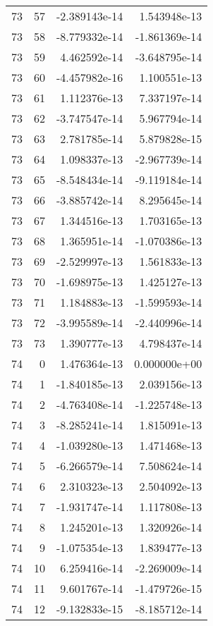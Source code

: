 \begin{tabular}{rrrr}
  73 &   57 & -2.389143e-14 &  1.543948e-13 \\
  73 &   58 & -8.779332e-14 & -1.861369e-14 \\
  73 &   59 &  4.462592e-14 & -3.648795e-14 \\
  73 &   60 & -4.457982e-16 &  1.100551e-13 \\
  73 &   61 &  1.112376e-13 &  7.337197e-14 \\
  73 &   62 & -3.747547e-14 &  5.967794e-14 \\
  73 &   63 &  2.781785e-14 &  5.879828e-15 \\
  73 &   64 &  1.098337e-13 & -2.967739e-14 \\
  73 &   65 & -8.548434e-14 & -9.119184e-14 \\
  73 &   66 & -3.885742e-14 &  8.295645e-14 \\
  73 &   67 &  1.344516e-13 &  1.703165e-13 \\
  73 &   68 &  1.365951e-14 & -1.070386e-13 \\
  73 &   69 & -2.529997e-13 &  1.561833e-13 \\
  73 &   70 & -1.698975e-13 &  1.425127e-13 \\
  73 &   71 &  1.184883e-13 & -1.599593e-14 \\
  73 &   72 & -3.995589e-14 & -2.440996e-14 \\
  73 &   73 &  1.390777e-13 &  4.798437e-14 \\
  74 &    0 &  1.476364e-13 &  0.000000e+00 \\
  74 &    1 & -1.840185e-13 &  2.039156e-13 \\
  74 &    2 & -4.763408e-14 & -1.225748e-13 \\
  74 &    3 & -8.285241e-14 &  1.815091e-13 \\
  74 &    4 & -1.039280e-13 &  1.471468e-13 \\
  74 &    5 & -6.266579e-14 &  7.508624e-14 \\
  74 &    6 &  2.310323e-13 &  2.504092e-13 \\
  74 &    7 & -1.931747e-14 &  1.117808e-13 \\
  74 &    8 &  1.245201e-13 &  1.320926e-14 \\
  74 &    9 & -1.075354e-13 &  1.839477e-13 \\
  74 &   10 &  6.259416e-14 & -2.269009e-14 \\
  74 &   11 &  9.601767e-14 & -1.479726e-15 \\
  74 &   12 & -9.132833e-15 & -8.185712e-14 \\

\end{tabular}
